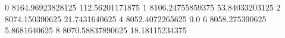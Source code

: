 0 8164.96923828125 112.56201171875
1 8106.24755859375 53.84033203125
2 8074.150390625 21.7431640625
4 8052.4072265625 0.0
6 8058.275390625 5.8681640625
8 8070.58837890625 18.18115234375
